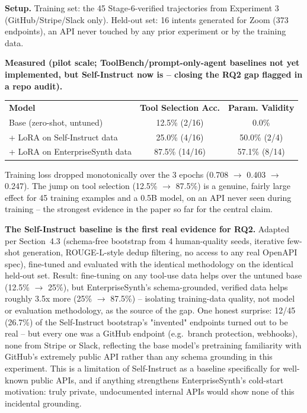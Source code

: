 \documentclass[11pt]{article}
\begin{document}
\textbf{Setup.} Training set: the 45 Stage-6-verified trajectories from Experiment 3
(GitHub/Stripe/Slack only). Held-out set: 16 intents generated for Zoom (373 endpoints), an API
never touched by any prior experiment or by the training data.

\textbf{Measured (pilot scale; ToolBench/prompt-only-agent baselines not yet implemented, but
Self-Instruct now is -- closing the RQ2 gap flagged in a repo audit).}

\begin{center}
\small
\begin{tabular}{lcc}
\textbf{Model} & \textbf{Tool Selection Acc.} & \textbf{Param. Validity} \\
Base (zero-shot, untuned) & 12.5\% (2/16) & 0.0\% \\
+ LoRA on Self-Instruct data & 25.0\% (4/16) & 50.0\% (2/4) \\
+ LoRA on EnterpriseSynth data & 87.5\% (14/16) & 57.1\% (8/14) \\
\end{tabular}
\end{center}

Training loss dropped monotonically over the 3 epochs (0.708 $\rightarrow$ 0.403 $\rightarrow$
0.247). The jump on tool selection (12.5\% $\rightarrow$ 87.5\%) is a genuine, fairly large effect
for 45 training examples and a 0.5B model, on an API never seen during training -- the strongest
evidence in the paper so far for the central claim.

\textbf{The Self-Instruct baseline is the first real evidence for RQ2.} Adapted per Section~4.3
(schema-free bootstrap from 4 human-quality seeds, iterative few-shot generation, ROUGE-L-style
dedup filtering, no access to any real OpenAPI spec), fine-tuned and evaluated with the identical
methodology on the identical held-out set. Result: fine-tuning on any tool-use data helps over the
untuned base (12.5\% $\rightarrow$ 25\%), but EnterpriseSynth's schema-grounded, verified data
helps roughly 3.5x more (25\% $\rightarrow$ 87.5\%) -- isolating training-data quality, not model
or evaluation methodology, as the source of the gap. One honest surprise: 12/45 (26.7\%) of the
Self-Instruct bootstrap's "invented" endpoints turned out to be real -- but every one was a GitHub
endpoint (e.g.\ branch protection, webhooks), none from Stripe or Slack, reflecting the base
model's pretraining familiarity with GitHub's extremely public API rather than any schema
grounding in this experiment. This is a limitation of Self-Instruct as a baseline specifically for
well-known public APIs, and if anything strengthens EnterpriseSynth's cold-start motivation: truly
private, undocumented internal APIs would show none of this incidental grounding.
\end{document}
